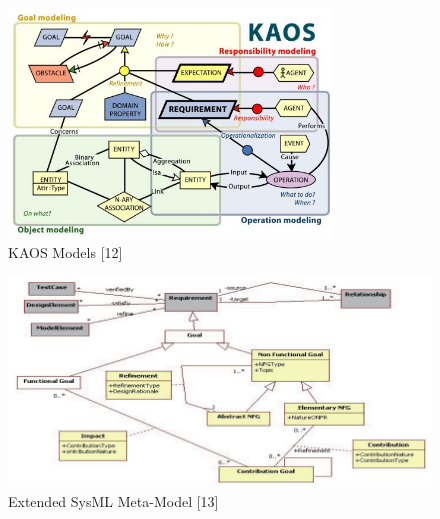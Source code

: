 \documentclass[10pt, conference, compsocconf]{IEEEtran}
\def\sysml{\textsc{SysML}}
\def\kaos{\textsc{Kaos}}
\newcommand{\Myfig}[1]{Figure~\ref{fig:#1}}
\begin{document}
\begin{figure}[!t]
\centering
\includegraphics[width=3.4in]{fig7}
\caption{KAOS Models [12]}
\label{fig:KAOS}
\end{figure}






\begin{figure}[!t]
\centering
\includegraphics[width=5.5in]{fig5}
\caption{Extended SysML Meta-Model [13]}
\label{fig:meta}
\end{figure}
\end{document}
